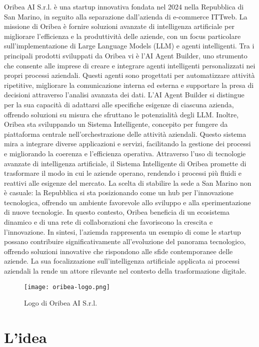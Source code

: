 Oribea AI S.r.l. è una startup innovativa fondata nel 2024 nella Repubblica di San Marino, in seguito alla separazione dall'azienda di e-commerce ITTweb. La missione di Oribea è fornire soluzioni avanzate di intelligenza artificiale per migliorare l'efficienza e la produttività delle aziende, con un focus particolare sull'implementazione di Large Language Models (LLM) e agenti intelligenti.
Tra i principali prodotti sviluppati da Oribea vi è l'AI Agent Builder, uno strumento che consente alle imprese di creare e integrare agenti intelligenti personalizzati nei propri processi aziendali. Questi agenti sono progettati per automatizzare attività ripetitive, migliorare la comunicazione interna ed esterna e supportare la presa di decisioni attraverso l'analisi avanzata dei dati. L'AI Agent Builder si distingue per la sua capacità di adattarsi alle specifiche esigenze di ciascuna azienda, offrendo soluzioni su misura che sfruttano le potenzialità degli LLM.
Inoltre, Oribea sta sviluppando un Sistema Intelligente, concepito per fungere da piattaforma centrale nell'orchestrazione delle attività aziendali. Questo sistema mira a integrare diverse applicazioni e servizi, facilitando la gestione dei processi e migliorando la coerenza e l'efficienza operativa. Attraverso l'uso di tecnologie avanzate di intelligenza artificiale, il Sistema Intelligente di Oribea promette di trasformare il modo in cui le aziende operano, rendendo i processi più fluidi e reattivi alle esigenze del mercato.
La scelta di stabilire la sede a San Marino non è casuale: la Repubblica si sta posizionando come un hub per l'innovazione tecnologica, offrendo un ambiente favorevole allo sviluppo e alla sperimentazione di nuove tecnologie. In questo contesto, Oribea beneficia di un ecosistema dinamico e di una rete di collaborazioni che favoriscono la crescita e l'innovazione.
In sintesi, l'aziemda rappresenta un esempio di come le startup possano contribuire significativamente all'evoluzione del panorama tecnologico, offrendo soluzioni innovative che rispondono alle sfide contemporanee delle aziende. La sua focalizzazione sull'intelligenza artificiale applicata ai processi aziendali la rende un attore rilevante nel contesto della trasformazione digitale.

\begin{figure}
    \centering
    \texttt{[image: oribea-logo.png]}
    \caption{Logo di Oribea AI S.r.l.}
    \label{fig:oribea-logo}
\end{figure}

\section{L'idea}

